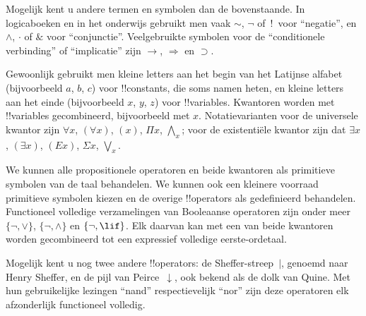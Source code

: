 \documentclass[openany]{memoir}
\begin{document}

\begin{intro}
Mogelijk kent u andere termen en symbolen dan de bovenstaande. In
logicaboeken en in het onderwijs gebruikt men vaak $\sim$, $\neg$ of~!\ voor
``negatie'', en $\wedge$, $\cdot$ of $\&$ voor ``conjunctie''.
Veelgebruikte symbolen voor de ``conditionele verbinding'' of
``implicatie'' zijn $\rightarrow$, $\Rightarrow$ en $\supset$.

Gewoonlijk gebruikt men kleine letters aan het begin van het Latijnse
alfabet (bijvoorbeeld $a$, $b$, $c$) voor !!{constant}s, die soms namen
heten, en kleine letters aan het einde (bijvoorbeeld $x$, $y$, $z$)
voor !!{variable}s. Kwantoren worden met !!{variable}s gecombineerd,
bijvoorbeeld met $x$. Notatievarianten voor de universele kwantor zijn
$\forall x$, $(\forall x)$, $(x)$, $\Pi x$, $\bigwedge_x$; voor de
existentiële kwantor zijn dat $\exists x$, $(\exists x)$, $(Ex)$,
$\Sigma x$, $\bigvee_x$.
\end{intro}

\begin{explain}
We kunnen alle propositionele operatoren en beide kwantoren als
primitieve symbolen van de taal behandelen. We kunnen ook een kleinere
voorraad primitieve symbolen kiezen en de overige !!{operator}s als
gedefinieerd behandelen. Functioneel volledige verzamelingen van
Booleaanse operatoren zijn onder meer $\{ \lnot, \lor \}$,
$\{ \lnot, \land \}$ en $\{ \lnot, \lif\}$. Elk daarvan kan met een
van beide kwantoren worden gecombineerd tot een expressief volledige
eerste-ordetaal.

Mogelijk kent u nog twee andere !!{operator}s: de Sheffer-streep~$|$,
genoemd naar Henry Sheffer, en de pijl van Peirce~$\downarrow$, ook
bekend als de dolk van Quine. Met hun gebruikelijke lezingen ``nand''
respectievelijk ``nor'' zijn deze operatoren elk afzonderlijk
functioneel volledig.
\end{explain}
\endgroup

\begingroup
\def\olfilename{OLP-0152}
\def\olfilepath{content/first-order-logic/syntax-and-semantics/}
\hypertarget{unit-OLP-0152}{}
\end{document}
